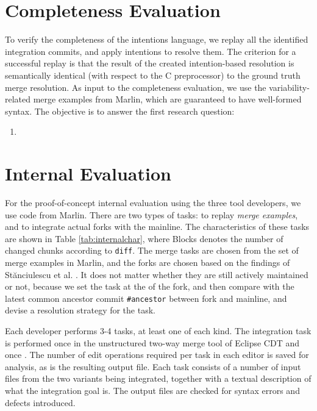 \section{Completeness Evaluation}
To verify the completeness of the intentions language, we replay all the identified integration commits, and apply intentions to resolve them. The criterion for a successful replay is that the result of the created intention-based resolution is semantically identical (with respect to the C preprocessor) to the ground truth merge resolution. As input to the completeness evaluation, we use the variability-related merge examples from Marlin, which are guaranteed to have well-formed syntax.
The objective is to answer the first research question:
\begin{enumerate}[label={Q\arabic*}]
    \setcounter{enumi}{0}
    \item \RQA
\end{enumerate}

\section{Internal Evaluation}
For the proof-of-concept internal evaluation using the three tool developers, we use code from Marlin. There are two types of tasks: to replay \textit{merge examples}, and to integrate actual forks with the mainline. The characteristics of these tasks are shown in Table \ref{tab:internalchar}, where Blocks denotes the number of changed chunks according to \texttt{diff}. The merge tasks are chosen from the set of merge examples in Marlin, and the forks are chosen based on the findings of St\u{a}nciulescu et al. \cite{stanciulescu2015}. It does not matter whether they are still actively maintained or not, because we set the task at the \head of the fork, and then compare with the latest common ancestor commit \texttt{\#ancestor} between fork and mainline, and devise a resolution strategy for the task.

Each developer performs 3-4 tasks, at least one of each kind. The integration task is performed once in the unstructured two-way merge tool of Eclipse CDT and once \tooln. The number of edit operations required per task in each editor is saved for analysis, as is the resulting output file. Each task consists of a number of input files from the two variants being integrated, together with a textual description of what the integration goal is. The output files are checked for syntax errors and defects introduced.

